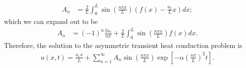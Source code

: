 \begin{align}
  A_n &= \frac{2}{L} \int_0^L \sin \left( \frac{ n \pi x }{ L } \right) \left( f(x) - \frac{u_r}{L} x \right) dx ;\nonumber
\end{align}
which we can expand out to be
\begin{align}
  A_n &= (-1)^n \frac{2 u_r}{n\pi} + \frac{2}{L} \int_0^L \sin \left( \frac{ n \pi x }{ L } \right) f(x) dx .
\end{align}
Therefore, the solution to the asymmetric transient heat conduction problem is
\begin{align}
  u(x,t) =  \frac{u_r x}{L} +  \sum_{n=1}^\infty A_n \sin \left( \frac{ n \pi x }{ L } \right)  \exp \left[ -\alpha \left( \frac{ n \pi }{ L } \right)^2 t \right] .
\end{align}

